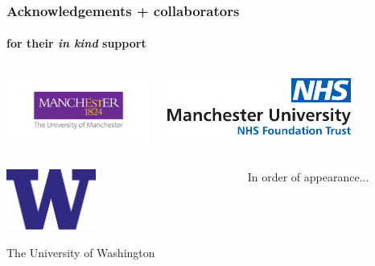 \documentclass{beamer}
\begin{document}
%


\begin{frame}
    \frametitle{Acknowledgements + collaborators}
    \framesubtitle{for their \emph{in kind} support}
    \begin{columns}
        \begin{column}{0.5\textwidth}
        \includegraphics[width=\textwidth]{figures/logo_big.jpg}
        \end{column}
        \begin{column}{0.5\textwidth}
        \includegraphics[width=0.75\textwidth]{figures/MFT-logo}
        \end{column}
    \end{columns}
    \begin{columns}
        \begin{column}{0.5\textwidth}
        \begin{center}
        \includegraphics[width=0.4\textwidth]{figures/W-Logo_Purple1}
        \end{center}

        The University of Washington
        \end{column}
        \begin{column}{0.5\textwidth}
        In order of appearance...


\end{column}
\end{columns}
\end{frame}
\end{document}
